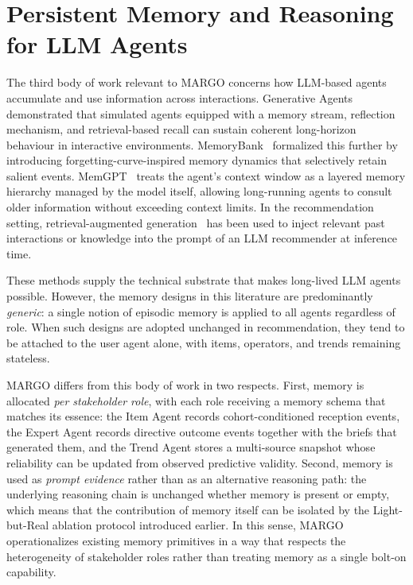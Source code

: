 \documentclass[master,english,final]{postech-ucs}
\begin{document}
\section{Persistent Memory and Reasoning for LLM Agents}
The third body of work relevant to MARGO concerns how LLM-based agents accumulate and use information across interactions.
Generative Agents~\cite{park2023generative} demonstrated that simulated agents equipped with a memory stream, reflection mechanism, and retrieval-based recall can sustain coherent long-horizon behaviour in interactive environments.
MemoryBank~\cite{zhong2024memorybank} formalized this further by introducing forgetting-curve-inspired memory dynamics that selectively retain salient events.
MemGPT~\cite{packer2023memgpt} treats the agent's context window as a layered memory hierarchy managed by the model itself, allowing long-running agents to consult older information without exceeding context limits.
In the recommendation setting, retrieval-augmented generation~\cite{lewis2020rag} has been used to inject relevant past interactions or knowledge into the prompt of an LLM recommender at inference time.

These methods supply the technical substrate that makes long-lived LLM agents possible.
However, the memory designs in this literature are predominantly \emph{generic}: a single notion of episodic memory is applied to all agents regardless of role.
When such designs are adopted unchanged in recommendation, they tend to be attached to the user agent alone, with items, operators, and trends remaining stateless.

MARGO differs from this body of work in two respects.
First, memory is allocated \emph{per stakeholder role}, with each role receiving a memory schema that matches its essence: the Item Agent records cohort-conditioned reception events, the Expert Agent records directive outcome events together with the briefs that generated them, and the Trend Agent stores a multi-source snapshot whose reliability can be updated from observed predictive validity.
Second, memory is used as \emph{prompt evidence} rather than as an alternative reasoning path: the underlying reasoning chain is unchanged whether memory is present or empty, which means that the contribution of memory itself can be isolated by the Light-but-Real ablation protocol introduced earlier.
In this sense, MARGO operationalizes existing memory primitives in a way that respects the heterogeneity of stakeholder roles rather than treating memory as a single bolt-on capability.
\end{document}
